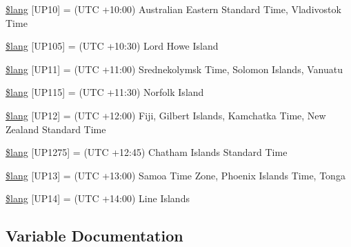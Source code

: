\begin{DoxyCompactItemize}
\item 
\hyperlink{_admin_2system_2language_2english_2date__lang_8php_ab55df5b1ac6457c16ea32f01070966f6}{\$lang} \mbox{[}\textquotesingle{}U\+P10\textquotesingle{}\mbox{]} = \textquotesingle{}(U\+T\+C +10\+:00) Australian Eastern Standard Time, Vladivostok Time\textquotesingle{}
\item 
\hyperlink{_admin_2system_2language_2english_2date__lang_8php_aeb674ae9d76fd6d0d9c9e77ed5a212e9}{\$lang} \mbox{[}\textquotesingle{}U\+P105\textquotesingle{}\mbox{]} = \textquotesingle{}(U\+T\+C +10\+:30) Lord Howe Island\textquotesingle{}
\item 
\hyperlink{_admin_2system_2language_2english_2date__lang_8php_a463ad4d63523352c17685f734b4ec7cc}{\$lang} \mbox{[}\textquotesingle{}U\+P11\textquotesingle{}\mbox{]} = \textquotesingle{}(U\+T\+C +11\+:00) Srednekolymsk Time, Solomon Islands, Vanuatu\textquotesingle{}
\item 
\hyperlink{_admin_2system_2language_2english_2date__lang_8php_a46fa8957c8e606d1641bbcdd75cd2df0}{\$lang} \mbox{[}\textquotesingle{}U\+P115\textquotesingle{}\mbox{]} = \textquotesingle{}(U\+T\+C +11\+:30) Norfolk Island\textquotesingle{}
\item 
\hyperlink{_admin_2system_2language_2english_2date__lang_8php_a18a8bb072c3fe7db99091538ce5168be}{\$lang} \mbox{[}\textquotesingle{}U\+P12\textquotesingle{}\mbox{]} = \textquotesingle{}(U\+T\+C +12\+:00) Fiji, Gilbert Islands, Kamchatka Time, New Zealand Standard Time\textquotesingle{}
\item 
\hyperlink{_admin_2system_2language_2english_2date__lang_8php_a92e3c23bd9d963bbdfd21e39521bfdc1}{\$lang} \mbox{[}\textquotesingle{}U\+P1275\textquotesingle{}\mbox{]} = \textquotesingle{}(U\+T\+C +12\+:45) Chatham Islands Standard Time\textquotesingle{}
\item 
\hyperlink{_admin_2system_2language_2english_2date__lang_8php_ac197fec09ff547ca12a7fe3ffc5908ae}{\$lang} \mbox{[}\textquotesingle{}U\+P13\textquotesingle{}\mbox{]} = \textquotesingle{}(U\+T\+C +13\+:00) Samoa Time Zone, Phoenix Islands Time, Tonga\textquotesingle{}
\item 
\hyperlink{_admin_2system_2language_2english_2date__lang_8php_a50562230c497ebdba1f540d409110fce}{\$lang} \mbox{[}\textquotesingle{}U\+P14\textquotesingle{}\mbox{]} = \textquotesingle{}(U\+T\+C +14\+:00) Line Islands\textquotesingle{}
\end{DoxyCompactItemize}


\subsection{Variable Documentation}
\hypertarget{_admin_2system_2language_2english_2date__lang_8php_ad344b819f5b881c0e2d75c994b8781b7}{}
